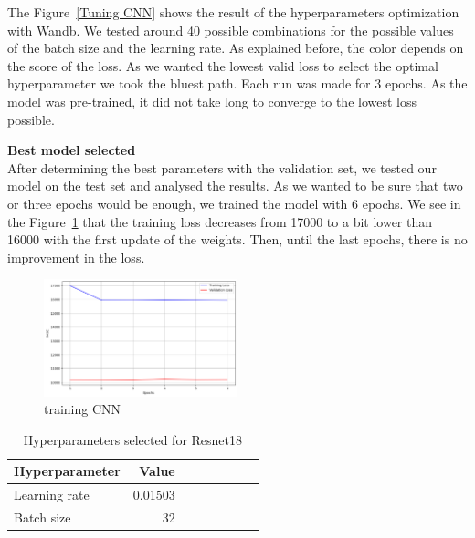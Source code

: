 \documentclass[12pt]{article}
\begin{document}
\noindent The Figure~\ref{Tuning CNN} shows the result of the hyperparameters optimization with Wandb. We tested around 40 possible combinations for the possible values of the batch size and the learning rate. As explained before, the color depends on the score of the loss. As we wanted the lowest valid loss to select the optimal hyperparameter we took the bluest path. Each run was made for 3 epochs. As the model was pre-trained, it did  not take long to converge to the lowest loss possible. 


\noindent \textbf{Best model selected} \\
\noindent After determining the best parameters with the validation set, we tested our model on the test set and analysed the results. As we wanted to be sure that two or three epochs would be enough, we trained the model with 6 epochs. We see in the Figure~\ref{Training CNN} that the training loss decreases from 17000 to a bit lower than 16000 with the first update of the weights. Then, until the last epochs, there is no improvement in the loss.


\noindent 
\FloatBarrier
\begin{figure}[ht]
    \centering
    \includegraphics[width=0.5\textwidth]{training CNN.png}
    \caption{training CNN}
    \label{Training CNN}
\end{figure}
\FloatBarrier



\FloatBarrier
\begin{table}[h]
    \centering
    \caption{Hyperparameters selected for Resnet18}
    \label{Hyperparameters Resnet18}
    \begin{tabular}{lrrrrrrr}
    \toprule
    Hyperparameter & Value \\
    \midrule
     Learning rate & 0.01503 \\
     Batch size & 32\\
    \bottomrule
    \end{tabular}
\end{table} \\ [0.1 cm]
\FloatBarrier
\end{document}
